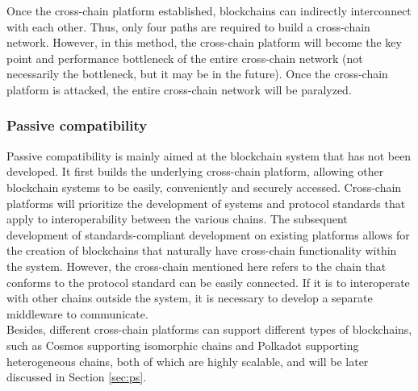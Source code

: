 \begin{enumerate}
\begin{figure}[H]
        \end{figure}
  Once the cross-chain platform established, blockchains can indirectly interconnect with each other. Thus, only four paths are required to build a cross-chain network. However, in this method, the cross-chain platform will become the key point and performance bottleneck of the entire cross-chain network (not necessarily the bottleneck, but it may be in the future). Once the cross-chain platform is attacked, the entire cross-chain network will be paralyzed.
\end{enumerate}
\subsubsection{Passive compatibility}
\noindent Passive compatibility is mainly aimed at the blockchain system that has not been developed. It first builds the underlying cross-chain platform, allowing other blockchain systems to be easily, conveniently and securely accessed. Cross-chain platforms will prioritize the development of systems and protocol standards that apply to interoperability between the various chains. The subsequent development of standards-compliant development on existing platforms allows for the creation of blockchains that naturally have cross-chain functionality within the system. However, the cross-chain mentioned here refers to the chain that conforms to the protocol standard can be easily connected. If it is to interoperate with other chains outside the system, it is necessary to develop a separate middleware to communicate.\\

\noindent Besides, different cross-chain platforms can support different types of blockchains, such as Cosmos supporting isomorphic chains and Polkadot supporting heterogeneous chains, both of which are highly scalable, and will be later discussed in Section \ref{sec:ps}.